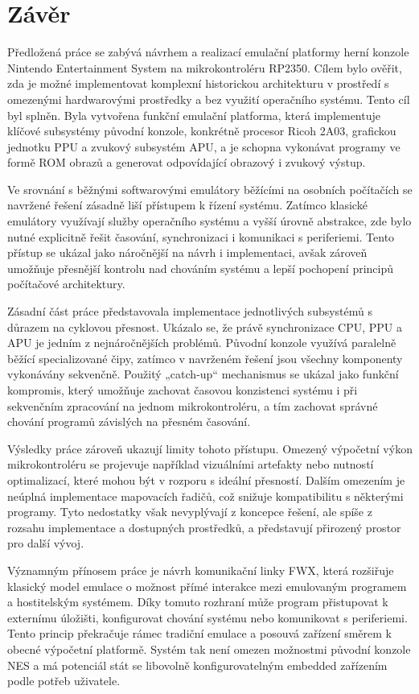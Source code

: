 \documentclass{soc}
\begin{document}
% 

\chapter{Závěr}

Předložená práce se zabývá návrhem a realizací emulační platformy herní konzole Nintendo
Entertainment System na mikrokontroléru RP2350. Cílem bylo ověřit, zda je možné implementovat
komplexní historickou architekturu v prostředí s omezenými hardwarovými prostředky a bez využití
operačního systému. Tento cíl byl splněn. Byla vytvořena funkční emulační platforma, která
implementuje klíčové subsystémy původní konzole, konkrétně procesor Ricoh 2A03, grafickou jednotku
PPU a zvukový subsystém APU, a je schopna vykonávat programy ve formě ROM obrazů a generovat
odpovídající obrazový i zvukový výstup.

Ve srovnání s běžnými softwarovými emulátory běžícími na osobních počítačích se navržené řešení
zásadně liší přístupem k řízení systému. Zatímco klasické emulátory využívají služby operačního
systému a vyšší úrovně abstrakce, zde bylo nutné explicitně řešit časování, synchronizaci i
komunikaci s periferiemi. Tento přístup se ukázal jako náročnější na návrh i implementaci, avšak
zároveň umožňuje přesnější kontrolu nad chováním systému a lepší pochopení principů počítačové
architektury.

Zásadní část práce představovala implementace jednotlivých subsystémů s důrazem na cyklovou
přesnost. Ukázalo se, že právě synchronizace CPU, PPU a APU je jedním z nejnáročnějších problémů.
Původní konzole využívá paralelně běžící specializované čipy, zatímco v navrženém řešení jsou
všechny komponenty vykonávány sekvenčně. Použitý „catch-up“ mechanismus se ukázal jako funkční
kompromis, který umožňuje zachovat časovou konzistenci systému i při sekvenčním zpracování na jednom
mikrokontroléru, a tím zachovat správné chování programů závislých na přesném časování.

Výsledky práce zároveň ukazují limity tohoto přístupu. Omezený výpočetní výkon mikrokontroléru se
projevuje například vizuálními artefakty nebo nutností optimalizací, které mohou být v rozporu s
ideální přesností. Dalším omezením je neúplná implementace mapovacích řadičů, což snižuje
kompatibilitu s některými programy. Tyto nedostatky však nevyplývají z koncepce řešení, ale spíše z
rozsahu implementace a dostupných prostředků, a představují přirozený prostor pro další vývoj.

Významným přínosem práce je návrh komunikační linky FWX, která rozšiřuje klasický model emulace o
možnost přímé interakce mezi emulovaným programem a hostitelským systémem. Díky tomuto rozhraní může
program přistupovat k externímu úložišti, konfigurovat chování systému nebo komunikovat s
periferiemi. Tento princip překračuje rámec tradiční emulace a posouvá zařízení směrem k obecné
výpočetní platformě. Systém tak není omezen možnostmi původní konzole NES a má potenciál stát se
libovolně konfigurovatelným embedded zařízením podle potřeb uživatele.
\end{document}

